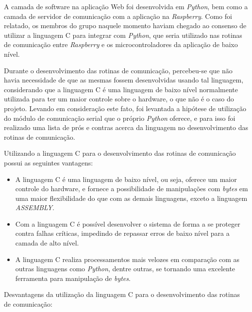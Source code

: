 
A camada de software na aplicação Web foi desenvolvida em \textit{Python}, bem como a camada de servidor de comunicação com a aplicação na 
\textit{Raspberry}. Como foi relatado, os membros do grupo naquele momento haviam chegado ao consenso de utilizar a linguagem C para integrar 
com \textit{Python}, que seria utilizado nas rotinas de comunicação entre \textit{Raspberry} e os microcontroladores da aplicação de baixo nível.

Durante o desenvolvimento das rotinas de comunicação, percebeu-se que não havia necessidade de que as mesmas fossem desenvolvidas 
usando tal linguagem, considerando que a linguagem C é uma linguagem de baixo nível normalmente utilizada para ter um maior controle sobre o 
hardware, o que não é o caso do projeto. Levando em consideração este fato, foi levantada a hipótese de utilização do módulo de comunicação serial que o próprio 
\textit{Python} oferece, e para isso foi realizado uma lista de prós e contras acerca da linguagem no desenvolvimento das rotinas de comunicação.

Utilizando a linguagem C para o desenvolvimento das rotinas de comunicação possui as seguintes vantagens:

\begin{itemize}
    \item A linguagem C é uma linguagem de baixo nível, ou seja, oferece um maior controle do hardware, e fornece a possibilidade de manipulações com \textit{bytes} em uma maior flexibilidade do que com as demais linguagens, exceto a linguagem \textit{ASSEMBLY}.
    \item Com a linguagem C é possível desenvolver o sistema de forma a se proteger contra falhas críticas, impedindo de repassar erros de baixo nível para a camada de alto nível.
    \item A linguagem C realiza processamentos mais velozes em comparação com as outras linguagens como \textit{Python}, dentre outras, se tornando uma excelente ferramenta para manipulação de \textit{bytes}.
\end{itemize}

Desvantagens da utilização da linguagem C para o desenvolvimento das rotinas de comunicação:

